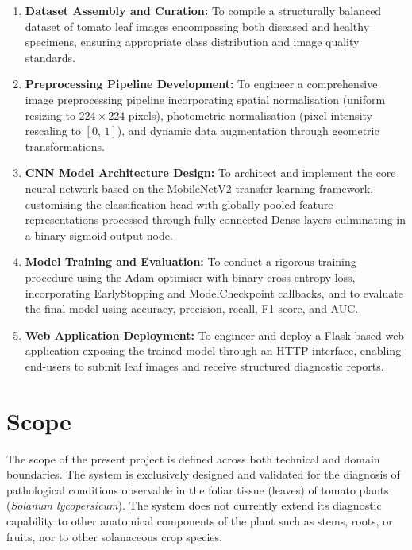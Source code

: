 \documentclass[12pt,a4paper]{report}
\begin{document}
\begin{enumerate}[label=\arabic*., leftmargin=*, itemsep=4pt]
    \item \textbf{Dataset Assembly and Curation:} To compile a structurally balanced dataset of tomato leaf images encompassing both diseased and healthy specimens, ensuring appropriate class distribution and image quality standards.

    \item \textbf{Preprocessing Pipeline Development:} To engineer a comprehensive image preprocessing pipeline incorporating spatial normalisation (uniform resizing to $224 \times 224$ pixels), photometric normalisation (pixel intensity rescaling to $[0,\,1]$), and dynamic data augmentation through geometric transformations.

    \item \textbf{CNN Model Architecture Design:} To architect and implement the core neural network based on the MobileNetV2 transfer learning framework, customising the classification head with globally pooled feature representations processed through fully connected Dense layers culminating in a binary sigmoid output node.

    \item \textbf{Model Training and Evaluation:} To conduct a rigorous training procedure using the Adam optimiser with binary cross-entropy loss, incorporating EarlyStopping and ModelCheckpoint callbacks, and to evaluate the final model using accuracy, precision, recall, F1-score, and AUC.

    \item \textbf{Web Application Deployment:} To engineer and deploy a Flask-based web application exposing the trained model through an HTTP interface, enabling end-users to submit leaf images and receive structured diagnostic reports.
\end{enumerate}

\section{Scope}

The scope of the present project is defined across both technical and domain boundaries. The system is exclusively designed and validated for the diagnosis of pathological conditions observable in the foliar tissue (leaves) of tomato plants (\textit{Solanum lycopersicum}). The system does not currently extend its diagnostic capability to other anatomical components of the plant such as stems, roots, or fruits, nor to other solanaceous crop species.
\end{document}
